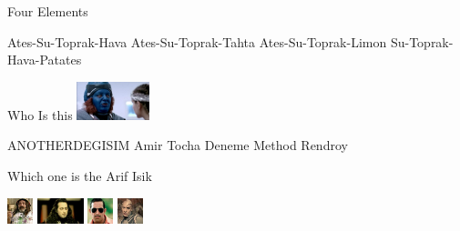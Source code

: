 \documentclass{exam}
\begin{document}
\begin{questions}
\question Four Elements\newline
\begin{oneparchoices}
\choice Ates-Su-Toprak-Hava
\choice Ates-Su-Toprak-Tahta
\choice Ates-Su-Toprak-Limon
\choice Su-Toprak-Hava-Patates
\end{oneparchoices}
\question Who Is this\newline
\includegraphics[height=3em]{rendroy2.jpg} \newline
\begin{oneparchoices}
\choice ANOTHERDEGISIM
\choice Amir Tocha
\choice Deneme Method
\choice Rendroy
\end{oneparchoices}
\question Which one is the Arif Isik\newline
\begin{oneparchoices}
\choice \includegraphics[height=2em]{faruk.jpg}
\choice \includegraphics[height=2em]{komutanlogar.jpeg}
\choice \includegraphics[height=2em]{arifisik.jpg}
\choice \includegraphics[height=2em]{216.jpg}
\end{oneparchoices}
\end{questions}
\end{document}
